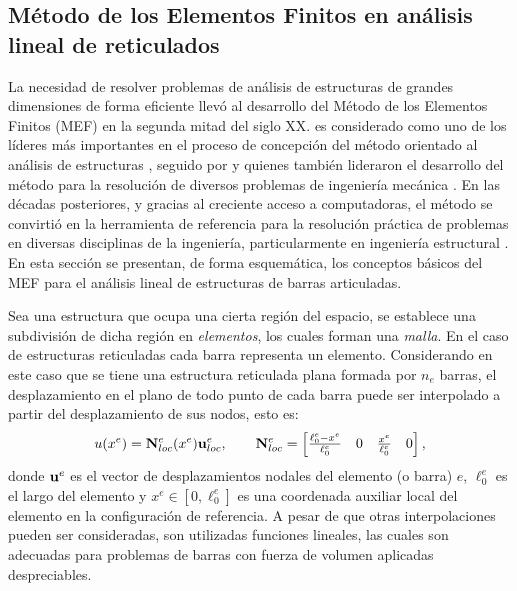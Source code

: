 \subsection{Método de los Elementos Finitos en análisis lineal de reticulados}

%
La necesidad de resolver problemas de análisis de estructuras de grandes dimensiones de forma eficiente llevó al desarrollo del Método de los Elementos Finitos (MEF) en la segunda mitad del siglo XX. %
%
\citeauthor{Zienkiewicz1972} es considerado como uno de los líderes más importantes en el proceso de concepción del método orientado al análisis de estructuras \citep{Zienkiewicz1972}, seguido por \citeauthor{Bathe1982} y \citeauthor{Hughes1987a} quienes también lideraron el desarrollo del método para la resolución de diversos problemas de ingeniería mecánica \citep{Bathe1982,Hughes1987a}. %
%
En las décadas posteriores, y gracias al creciente acceso a computadoras, el método se convirtió en la herramienta de referencia para la resolución práctica de problemas en diversas disciplinas de la ingeniería, particularmente en ingeniería estructural \citep{Onate2013,Zienkiewicz2014}. %
%
En esta sección se presentan, de forma esquemática, los conceptos básicos del MEF para el análisis lineal de estructuras de barras articuladas.



Sea una estructura que ocupa una cierta región del espacio, se establece una subdivisión de dicha región en \textit{elementos}, los cuales forman una \textit{malla}. %
%
En el caso de estructuras reticuladas cada barra representa un elemento. %
%
Considerando en este caso que se tiene una estructura reticulada plana formada por $n_e$ barras, el desplazamiento en el plano de todo punto de cada barra puede ser interpolado a partir del desplazamiento de sus nodos, esto es:
%
\begin{equation}
u(x^e) = {\bf N}_{loc}^e(x^e) {\bf u}_{loc}^e,
\qquad
{\bf N}_{loc}^e = \left[ \begin{matrix}
\frac{\ell_0^e - x^e}{\ell_0^e} & 0 & \frac{x^e}{\ell_0^e} & 0
\end{matrix} \right],
\end{equation}
%
donde ${\bf u}^e$ es el vector de desplazamientos nodales del elemento (o barra) $e$, $\ell_0^e$ es el largo del elemento y $x^e\in[0,\ell_0^e]$ es una coordenada auxiliar local del elemento en la configuración de referencia. %
%
A pesar de que otras interpolaciones pueden ser consideradas, son utilizadas funciones lineales, las cuales son adecuadas para problemas de barras con fuerza de volumen aplicadas despreciables.


